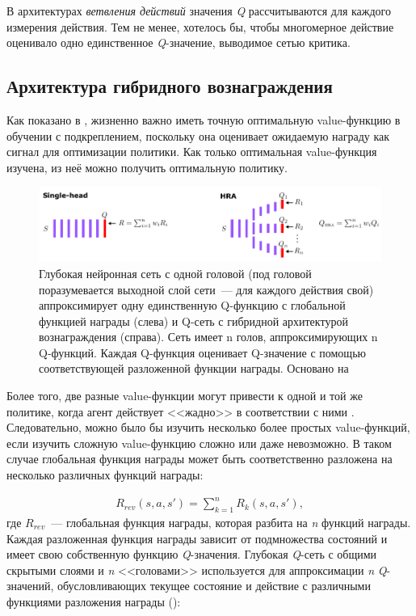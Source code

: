 В архитектурах \textit{ветвления действий} значения \textit{Q} рассчитываются для каждого измерения действия. Тем не менее, хотелось бы, чтобы многомерное действие оценивало одно единственное \textit{Q}-значение, выводимое сетью критика.

\subsection{Архитектура гибридного вознаграждения}

Как показано в \cite{seijen2017hybrid}, жизненно важно иметь точную оптимальную value-функцию в обучении с подкреплением, поскольку она оценивает ожидаемую награду как сигнал для оптимизации политики. Как только оптимальная value-функция изучена, из неё можно получить оптимальную политику.

\begin{figure}[ht!]
    \center
    \includegraphics [scale=0.80] {my_folder/images/ch2/hybrid-reward.png}
    \caption{Глубокая нейронная сеть с одной головой (под головой поразумевается выходной слой сети~--- для каждого действия свой) аппроксимирует одну единственную Q-функцию с глобальной функцией награды (слева) и Q-сеть с гибридной архитектурой вознаграждения (справа). Сеть имеет n голов, аппроксимирующих n Q-функций. Каждая Q-функция оценивает Q-значение с помощью соответствующей разложенной функции награды. Основано на \cite{seijen2017hybrid}}
    \label{fig:ch2-hybrid-reward}
\end{figure}

Более того, две разные value-функции могут привести к одной и той же политике, когда агент действует <<жадно>> в соответствии с ними \cite{seijen2017hybrid}. Следовательно, можно было бы изучить несколько более простых value-функций, если изучить сложную value-функцию сложно или даже невозможно. В таком случае глобальная функция награды может быть соответственно разложена на несколько различных функций награды:

\begin{equation}
    \begin{multlined}
        R_{rev}(s, a, s') = \sum^n_{k=1} R_k (s, a, s'),
    \end{multlined}
\end{equation}
где $R_{rev}$~--- глобальная функция награды, которая разбита на \textit{n} функций награды. Каждая разложенная функция награды зависит от подмножества состояний и имеет свою собственную функцию \textit{Q}-значения. Глубокая \textit{Q}-сеть с общими скрытыми слоями и \textit{n} <<головами>> используется для аппроксимации \textit{n} \textit{Q}-значений, обусловливающих текущее состояние и действие с различными функциями разложения награды ():

